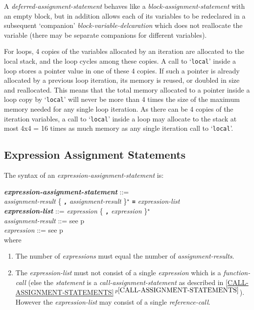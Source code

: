\documentclass[12pt]{article}
\newcommand{\TT}[1]{{\tt \bfseries #1}}
\newcommand{\STAR}{{\Large $^\star$}}
\newcommand{\emkey}[1]{{\em \bfseries #1}}
\newcommand{\itemref}[1]{\ref{#1}$\,^{p\pageref{#1}}$}
\newcommand{\pagref}[1]{p\pageref{#1}}
\newenvironment{indpar}[1][0.3in]%
	{\begin{list}{}%
		     {\setlength{\itemsep}{0in}%
		      \setlength{\topsep}{0in}%
		      \setlength{\parsep}{1ex}%
		      \setlength{\labelwidth}{#1}%
		      \setlength{\leftmargin}{#1}%
		      \addtolength{\leftmargin}{\labelsep}}%
	 \item}%
	{\end{list}}
\begin{document}
A {\em deferred-assignment-statement}
behaves like a {\em block-assignment-statement} with an empty block,
but in addition allows each of its variables to be redeclared in a subsequent
`companion' {\em block-variable-delcaration} which does not
reallocate the variable (there may be separate companions for different
variables).

For loops\label{LOOP-ALLOCATION},
4 copies of the variables allocated by an iteration
are allocated to the local stack,
and the loop cycles among these copies.
A call to `{\tt local}' inside a loop stores a pointer value in
one of these 4 copies.  If such a pointer is already
allocated by a previous loop iteration, its memory is reused, or
doubled in size and reallocated.  This means that the total memory allocated
to a pointer inside a loop copy by `{\tt local}' will never be more than
4 times the size of the maximum memory needed for any single loop
iteration.  As there can be 4 copies of the iteration variables,
a call to `{\tt local}' inside a loop
may allocate to the stack at most 4x4 = 16 times as much
memory as any single iteration call to `{\tt local}'.


\subsection{Expression Assignment Statements}
\label{EXPRESSION-ASSIGNMENT-STATEMENTS}

The syntax of an {\em expression-assign\-ment-statement} is:
\begin{indpar}
\emkey{expression-assignment-statement} ::= \\
\hspace*{0.5in} {\em assignment-result}
                \{ \TT{,} {\em assignment-result} \}\STAR{}
		\TT{=} {\em expression-list}
\\[0.5ex]
\emkey{expression-list}\label{EXPRESSION-LIST} ::=
	      {\em expression} \{ \TT{,} {\em expression} \}\STAR{}
\\[0.5ex]
{\em assignment-result} ::= see \pagref{ASSIGNMENT-RESULT}
\\[0.5ex]
{\em expression} ::= see \pagref{EXPRESSION}
\\[2.0ex]
where
\begin{enumerate}

\item The number of {\em expressions} must equal the number
of {\em assignment-results}.

\item The {\em expression-list} must not consist of a single
{\em expression} which is a {\em function-call} (else the
{\em statement} is a {\em call-assignment-statement} as described in
\itemref{CALL-ASSIGNMENT-STATEMENTS}).  However the {\em expression-list}
may consist of a single {\em reference-call}.

\end{enumerate}
\end{indpar}
\end{document}

